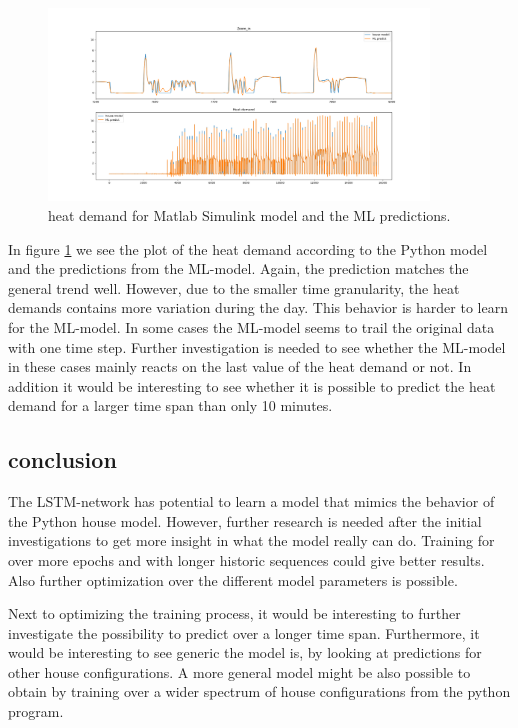 \begin{figure}[H]
	\centering
		\includegraphics[width = 0.9\textwidth]{figures/seq_84_epoch_1000_Python1.png}
		\caption{heat demand for Matlab Simulink model and the ML predictions.}
	\label{fig:python_seq84}
\end{figure}

In figure \ref{fig:python_seq84} we see the plot of the heat demand according to the Python model and the predictions from the ML-model. Again, the prediction matches the general trend well. However, due to the smaller time granularity, the heat demands contains more variation during the day. This behavior is harder to learn for the ML-model. In some cases the ML-model seems to trail the original data with one time step. Further investigation is needed to see whether the ML-model in these cases mainly reacts on the last value of the heat demand or not. In addition it would be interesting to see whether it is possible to predict the heat demand for a larger time span than only 10 minutes. 

\subsection{conclusion}
The LSTM-network has potential to learn a model that mimics the behavior of the Python house model. However, further research is needed after the initial investigations to get more insight in what the model really can do. Training for over more epochs and with longer historic sequences could give better results.  Also further optimization over the different model parameters is possible. 

Next to optimizing the training process, it would be interesting to further investigate the possibility to predict over a longer time span. Furthermore, it would be interesting to see generic the model is, by looking at predictions for other house configurations. A more general model might be also possible to obtain by training over a wider spectrum of house configurations from the python program. 

